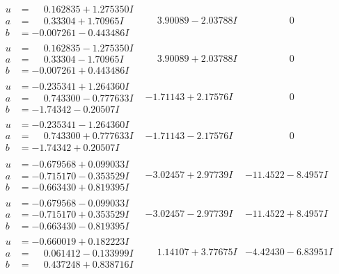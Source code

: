 \documentclass[1p]{elsarticle_modified}
\theoremstyle{definition}
\begin{document}
$$\begin{array}{c|c|c}
\begin{aligned}
u &= \phantom{-}0.162835 + 1.275350 I \\
a &= \phantom{-}0.33304 + 1.70965 I \\
b &= -0.007261 - 0.443486 I\end{aligned}
 & \phantom{-}3.90089 - 2.03788 I & \phantom{-0.000000 } 0 \\ \hline\begin{aligned}
u &= \phantom{-}0.162835 - 1.275350 I \\
a &= \phantom{-}0.33304 - 1.70965 I \\
b &= -0.007261 + 0.443486 I\end{aligned}
 & \phantom{-}3.90089 + 2.03788 I & \phantom{-0.000000 } 0 \\ \hline\begin{aligned}
u &= -0.235341 + 1.264360 I \\
a &= \phantom{-}0.743300 - 0.777633 I \\
b &= -1.74342 - 0.20507 I\end{aligned}
 & -1.71143 + 2.17576 I & \phantom{-0.000000 } 0 \\ \hline\begin{aligned}
u &= -0.235341 - 1.264360 I \\
a &= \phantom{-}0.743300 + 0.777633 I \\
b &= -1.74342 + 0.20507 I\end{aligned}
 & -1.71143 - 2.17576 I & \phantom{-0.000000 } 0 \\ \hline\begin{aligned}
u &= -0.679568 + 0.099033 I \\
a &= -0.715170 - 0.353529 I \\
b &= -0.663430 + 0.819395 I\end{aligned}
 & -3.02457 + 2.97739 I & -11.4522 - 8.4957 I \\ \hline\begin{aligned}
u &= -0.679568 - 0.099033 I \\
a &= -0.715170 + 0.353529 I \\
b &= -0.663430 - 0.819395 I\end{aligned}
 & -3.02457 - 2.97739 I & -11.4522 + 8.4957 I \\ \hline\begin{aligned}
u &= -0.660019 + 0.182223 I \\
a &= \phantom{-}0.061412 - 0.133999 I \\
b &= \phantom{-}0.437248 + 0.838716 I\end{aligned}
 & \phantom{-}1.14107 + 3.77675 I & -4.42430 - 6.83951 I \\ \hline\begin{aligned}

\end{aligned}
\end{array}$$
\end{document}
